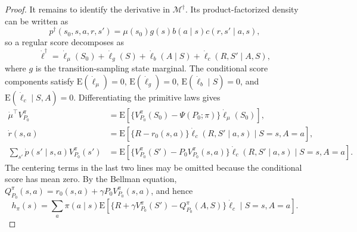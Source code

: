 \documentclass[10pt,a4paper]{amsart}
\newcommand{\E}{\mathrm{E}}
\begin{document}
\begin{proof}
    It remains to identify the derivative in
    $\mathcal M^\dagger$.  Its product-factorized density can be
    written as
    \[
        p^\dagger(s_0,s,a,r,s')
        =\mu(s_0)g(s)b(a\mid s)c(r,s'\mid a,s),
    \]
    so a regular score decomposes as
    \[
        \dot\ell^\dagger
        =\dot\ell_\mu(S_0)+\dot\ell_g(S)
        +\dot\ell_b(A\mid S)
        +\dot\ell_c(R,S'\mid A,S),
    \]
    where $g$ is the transition-sampling state marginal.  The
    conditional score components satisfy
    $\E(\dot\ell_\mu)=0$,
    $\E(\dot\ell_g)=0$,
    $\E(\dot\ell_b\mid S)=0$, and
    $\E(\dot\ell_c\mid S,A)=0$.
    Differentiating the primitive laws gives
    \[
        \begin{aligned}
        \dot\mu^\top V_{P_0}^\pi
        &=\E\!\left[
        \{V_{P_0}^\pi(S_0)-\Psi(P_0;\pi)\}
        \dot\ell_\mu(S_0)\right],\\
        \dot r(s,a)
        &=\E\!\left[
        \{R-r_0(s,a)\}\dot\ell_c(R,S'\mid a,s)
        \mid S=s,A=a\right],\\
        \sum_{s'}\dot p(s'\mid s,a)V_{P_0}^\pi(s')
        &=\E\!\left[
        \{V_{P_0}^\pi(S')
        -P_0V_{P_0}^\pi(s,a)\}
        \dot\ell_c(R,S'\mid a,s)
        \mid S=s,A=a\right].
        \end{aligned}
    \]
    The centering terms in the last two lines may be omitted because
    the conditional score has mean zero.  By the Bellman equation,
    $Q_{P_0}^\pi(s,a)
      =r_0(s,a)+\gamma P_0V_{P_0}^\pi(s,a)$, and hence
    \[
        h_\pi(s)
        =
        \sum_a\pi(a\mid s)
        \E\!\left[
        \{R+\gamma V_{P_0}^\pi(S')
        -Q_{P_0}^\pi(A,S)\}\dot\ell_c
        \mid S=s,A=a\right].
    \]


\end{proof}
\end{document}

